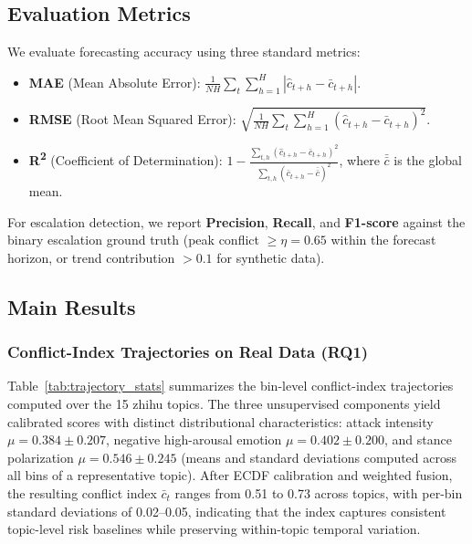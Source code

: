 \documentclass[journal]{IEEEtran}
\begin{document}
\subsection{Evaluation Metrics}

We evaluate forecasting accuracy using three standard metrics:
\begin{itemize}
\item \textbf{MAE} (Mean Absolute Error): $\frac{1}{N H}\sum_{t}\sum_{h=1}^{H}|\hat{c}_{t+h}-\bar{c}_{t+h}|$.
\item \textbf{RMSE} (Root Mean Squared Error): $\sqrt{\frac{1}{N H}\sum_{t}\sum_{h=1}^{H}(\hat{c}_{t+h}-\bar{c}_{t+h})^2}$.
\item \textbf{R\textsuperscript{2}} (Coefficient of Determination): $1 - \frac{\sum_{t,h}(\hat{c}_{t+h}-\bar{c}_{t+h})^2}{\sum_{t,h}(\bar{c}_{t+h}-\bar{\bar{c}})^2}$, where $\bar{\bar{c}}$ is the global mean.
\end{itemize}

For escalation detection, we report \textbf{Precision}, \textbf{Recall}, and \textbf{F1-score} against the binary escalation ground truth (peak conflict $\ge \eta=0.65$ within the forecast horizon, or trend contribution $>0.1$ for synthetic data).

\subsection{Main Results}
\label{sec:main_results}

\subsubsection{Conflict-Index Trajectories on Real Data (RQ1)}

Table~\ref{tab:trajectory_stats} summarizes the bin-level conflict-index trajectories computed over the 15 zhihu topics. The three unsupervised components yield calibrated scores with distinct distributional characteristics: attack intensity $\mu=0.384\pm0.207$, negative high-arousal emotion $\mu=0.402\pm0.200$, and stance polarization $\mu=0.546\pm0.245$ (means and standard deviations computed across all bins of a representative topic). After ECDF calibration and weighted fusion, the resulting conflict index $\bar{c}_t$ ranges from 0.51 to 0.73 across topics, with per-bin standard deviations of 0.02--0.05, indicating that the index captures consistent topic-level risk baselines while preserving within-topic temporal variation.
\end{document}
